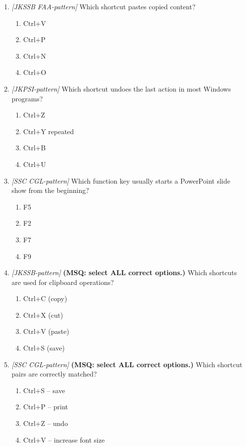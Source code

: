 \documentclass[11pt]{article}
\begin{document}
\begin{enumerate}[label=\textbf{Q\arabic*.}, leftmargin=*]
\item \textit{[JKSSB FAA-pattern]} Which shortcut pastes copied content?
  \begin{enumerate}[label=\Alph*.]
    \item Ctrl+V
    \item Ctrl+P
    \item Ctrl+N
    \item Ctrl+O
  \end{enumerate}
\item \textit{[JKPSI-pattern]} Which shortcut undoes the last action in most Windows programs?
  \begin{enumerate}[label=\Alph*.]
    \item Ctrl+Z
    \item Ctrl+Y repeated
    \item Ctrl+B
    \item Ctrl+U
  \end{enumerate}
\item \textit{[SSC CGL-pattern]} Which function key usually starts a PowerPoint slide show from the beginning?
  \begin{enumerate}[label=\Alph*.]
    \item F5
    \item F2
    \item F7
    \item F9
  \end{enumerate}
\item \textit{[JKSSB-pattern]} \textbf{(MSQ: select ALL correct options.)} Which shortcuts are used for clipboard operations?
  \begin{enumerate}[label=\Alph*.]
    \item Ctrl+C (copy)
    \item Ctrl+X (cut)
    \item Ctrl+V (paste)
    \item Ctrl+S (save)
  \end{enumerate}
\item \textit{[SSC CGL-pattern]} \textbf{(MSQ: select ALL correct options.)} Which shortcut pairs are correctly matched?
  \begin{enumerate}[label=\Alph*.]
    \item Ctrl+S -- save
    \item Ctrl+P -- print
    \item Ctrl+Z -- undo
    \item Ctrl+V -- increase font size
  \end{enumerate}
\end{enumerate}
\def\JKSSBLessonID{21}\def\JKSSBAnswers{0}
\end{document}
